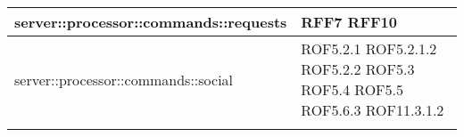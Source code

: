 \begin{center}
\begin{longtable}{| p{9cm} | p{4cm} |}
\hline
server::processor::commands::requests  & RFF7 \newline RFF10 \newline \\
\hline
server::processor::commands::social  &   ROF5.2.1 \newline ROF5.2.1.2 \newline ROF5.2.2 \newline ROF5.3 \newline ROF5.4 \newline ROF5.5 \newline ROF5.6.3 \newline ROF11.3.1.2 \newline \\
\hline \\
\end{longtable}
\egroup
\end{center}
